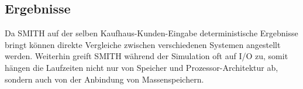 %

\subsection{Ergebnisse}
Da SMITH auf der selben Kaufhaus-Kunden-Eingabe deterministische Ergebnisse bringt können direkte Vergleiche zwischen verschiedenen Systemen angestellt werden.
Weiterhin greift SMITH während der Simulation oft auf I/O zu, somit hängen die Laufzeiten nicht nur von Speicher und Prozessor-Architektur ab, sondern auch von der Anbindung von Massenspeichern.